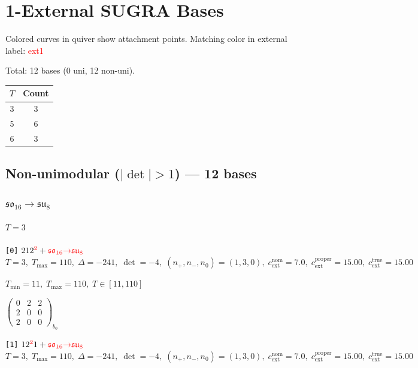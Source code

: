 \documentclass[10pt]{article}
\begin{document}
\section*{1-External SUGRA Bases}

Colored curves in quiver show attachment points. Matching color in external label: \textcolor{red}{ext1} 

Total: 12 bases (0 uni, 12 non-uni).

\begin{center}
\begin{tabular}{c|c}
\toprule
$T$ & Count \\
\midrule
3 & 3 \\
5 & 6 \\
6 & 3 \\
\bottomrule
\end{tabular}
\end{center}

\subsection*{Non-unimodular ($|\det|>1$) --- 12 bases}


\subsubsection*{$\mathfrak{so}_{16}{\to}\mathfrak{su}_8$}

\paragraph{$T=3$}

\texttt{[0]} $212^{\textcolor{red}{2}} + \textcolor{red}{\mathfrak{so}_{16}{\to}\mathfrak{su}_8}$ \quad $T=3,\;T_{\max}=110,\;\Delta=-241,\;\det=-4,\;(n_+,n_-,n_0)=(1,3,0),\;c_\mathrm{ext}^{\mathrm{nom}}=7.0,\;c_\mathrm{ext}^{\mathrm{proper}}=15.00,\;c_\mathrm{ext}^{\mathrm{true}}=15.00$

\hspace{1em}$T_{\min}=11,\;T_{\max}=110,\;T\in[11,110]$

\hspace{2em}$\left(\begin{smallmatrix}0 & 2 & 2 \\ 2 & 0 & 0 \\ 2 & 0 & 0\end{smallmatrix}\right)_{\!b_0}$

\texttt{[1]} $12^{\textcolor{red}{2}}1 + \textcolor{red}{\mathfrak{so}_{16}{\to}\mathfrak{su}_8}$ \quad $T=3,\;T_{\max}=110,\;\Delta=-241,\;\det=-4,\;(n_+,n_-,n_0)=(1,3,0),\;c_\mathrm{ext}^{\mathrm{nom}}=7.0,\;c_\mathrm{ext}^{\mathrm{proper}}=15.00,\;c_\mathrm{ext}^{\mathrm{true}}=15.00$
\end{document}
